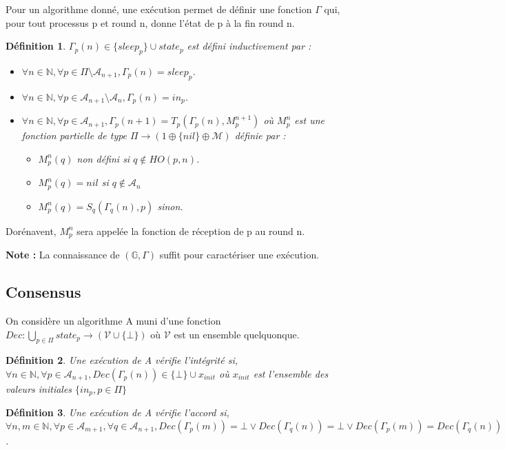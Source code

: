 \documentclass{article}
\newtheorem{definition}{Définition}
\begin{document}
Pour un algorithme donné, une exécution permet de définir une fonction $\Gamma$ qui,
pour tout processus p et round n, donne l'état de p à la fin round n.
\begin{definition}
	$\Gamma_p(n) \in \{sleep_p\} \cup state_p$ est défini inductivement par :
	\begin{itemize}
		\item $\forall n \in \mathds{N},\forall p \in \Pi \setminus \mathcal{A}_{n+1},  \Gamma_p(n) = sleep_p$.
		\item $\forall n \in \mathds{N},\forall p \in \mathcal{A}_{n+1} \setminus \mathcal{A}_n, \Gamma_p(n) = in_p$.
		\item $\forall n \in \mathds{N},\forall p \in \mathcal{A}_{n+1} ,  \Gamma_p(n+1) = T_p (\Gamma_p(n) ,M_p^{n+1})$
			où $M_p^n$ est une fonction partielle de type $\Pi \rightarrow (1 \oplus \{ nil \} \oplus \mathcal{M})$ définie par :
		\begin{itemize}
			\item $M_p^n(q)$ non défini si $q \notin HO(p, n)$.
			\item $M_p^n(q) = nil$ si $q \notin \mathcal{A}_n$
			\item $M_p^n(q) = S_q (\Gamma_q(n), p)$ sinon.
		\end{itemize}

	\end{itemize}
\end{definition}

Dorénavent, $M_p^n$ sera appelée la fonction de réception de p au round n.

\textbf{Note :} La connaissance de $(\mathds{G}, \Gamma)$ suffit pour caractériser une exécution.

\subsection{Consensus}

On considère un algorithme A muni d'une fonction
$Dec : \bigcup\limits_{p \in \Pi} state_p  \rightarrow (\mathcal{V} \cup \{\bot\})$ où $\mathcal{V}$ est un ensemble quelquonque.

\begin{definition}
	Une exécution de A vérifie l'intégrité si, $ \forall n \in \mathds{N},\forall p \in \mathcal{A}_{n+1}, Dec(\Gamma_p(n)) \in \{ \bot \} \cup x_{init}$
	où $x_{init}$ est l'ensemble des valeurs initiales $\{ in_p, p \in \Pi \}$
\end{definition}

\begin{definition}
	Une exécution de A vérifie l'accord si, 
	$\forall n, m \in \mathds{N}, \forall p \in \mathcal{A}_{m+1}, \forall q \in \mathcal{A}_{n+1}, Dec(\Gamma_p(m)) = \bot \vee Dec(\Gamma_q(n)) = \bot \vee Dec(\Gamma_p(m)) = Dec(\Gamma_q(n))$.
\end{definition}
\end{document}
